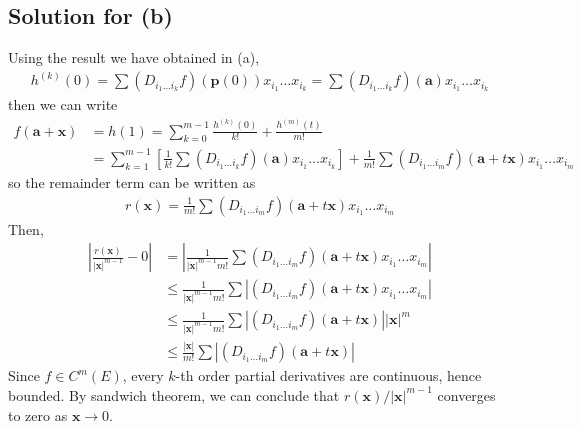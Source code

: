 \documentclass{scrartcl}
\begin{document}
\subsection{Solution for (b)}
Using the result we have obtained in (a),
\begin{align*}
  h^{(k)} (0)
  = \sum (D_{i_1 \dots i_k} f) (\mathbf{p}(0)) x_{i_1} \dots x_{i_k}
  = \sum (D_{i_1 \dots i_k} f) (\mathbf{a}) x_{i_1} \dots x_{i_k}
\end{align*}
then we can write
\begin{align*}
  f(\mathbf{a} + \mathbf{x})
  &= h(1)
  = \sum^{m - 1}_{k = 0} \frac{h^{(k)}(0)}{k!} + \frac{h^{(m)}(t)}{m!} \\
  &= \sum^{m - 1}_{k = 1}
    \left[ \frac{1}{k!}
      \sum (D_{i_1 \dots i_k} f) (\mathbf{a}) x_{i_1} \dots x_{i_k} \right]
    + \frac{1}{m!}
      \sum (D_{i_1 \dots i_m} f)
        (\mathbf{a} + t\mathbf{x}) x_{i_1} \dots x_{i_m}
\end{align*}
so the remainder term can be written as
\begin{align*}
  r(\mathbf{x})
  = \frac{1}{m!}
    \sum (D_{i_1 \dots i_m} f) (\mathbf{a} + t\mathbf{x}) x_{i_1} \dots x_{i_m}
\end{align*}
Then,
\begin{align*}
  \left| \frac{r(\mathbf{x})}{|\mathbf{x}|^{m - 1}} - 0 \right|
  &= \left| \frac{1}{|\mathbf{x}|^{m - 1} m!}
    \sum (D_{i_1 \dots i_m} f) (\mathbf{a} + t\mathbf{x}) x_{i_1} \dots x_{i_m}
  \right| \\
  &\le \frac{1}{|\mathbf{x}|^{m - 1} m!}
    \sum | (D_{i_1 \dots i_m} f) (\mathbf{a} + t\mathbf{x})
      x_{i_1} \dots x_{i_m} | \\
  &\le \frac{1}{|\mathbf{x}|^{m - 1} m!}
    \sum | (D_{i_1 \dots i_m} f) (\mathbf{a} + t\mathbf{x}) | |\mathbf{x}|^m \\
  &\le \frac{|\mathbf{x}|}{m!}
    \sum | (D_{i_1 \dots i_m} f) (\mathbf{a} + t\mathbf{x}) |
\end{align*}
Since \(f \in C^m(E)\), every \(k\)-th order partial derivatives are
continuous, hence bounded. By sandwich theorem, we can conclude that
\(r(\mathbf{x}) / |\mathbf{x}|^{m - 1}\) converges to zero as \(\mathbf{x} \to
0\).
\end{document}
